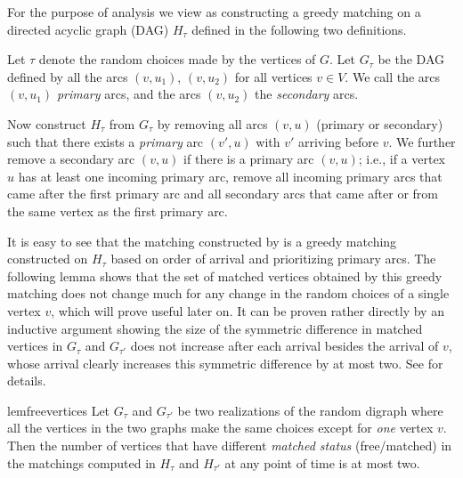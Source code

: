 For the purpose of analysis we view  as constructing a greedy matching on a directed acyclic graph (DAG) $H_\tau$ defined in the following two definitions.

\begin{Def}\label{def:g-tau}
Let $\tau$ denote the random choices made by the vertices of $G$. Let $G_\tau$ be the DAG defined by all the arcs $(v, u_1)$, $(v, u_2)$ for all vertices $v \in V$. 
We call the arcs $(v, u_1)$ \emph{primary} arcs, and the arcs $(v, u_2)$ the \emph{secondary} arcs. 
\end{Def}

\begin{Def}\label{def:h-tau}
Now construct $H_\tau$ from $G_\tau$ by removing all arcs $(v, u)$ (primary or secondary) such that there exists 
a \emph{primary} arc $(v', u)$ with $v'$ arriving before $v$. We further remove a secondary arc $(v,u)$ if there is a primary arc $(v,u)$; 
i.e., if a vertex $u$ has at least one incoming primary arc, remove all incoming primary arcs 
that came after the first primary arc and all secondary arcs that came after or from the same vertex as the first primary arc. 
\end{Def}

It is easy to see that the matching constructed by  is a greedy matching constructed on $H_\tau$ based on order of arrival and prioritizing primary arcs. The following lemma shows that the set of matched vertices obtained by this greedy matching does not change much for any change in the random choices of a single vertex $v$, which will prove useful later on. 
It can be proven rather directly by an inductive argument showing the size of the symmetric difference in matched vertices in $G_\tau$ and $G_{\tau'}$ does not increase after each arrival besides the arrival of $v$, whose arrival clearly increases this symmetric difference by at most two. See  for details.

\begin{restatable}{lem}{freevertices}\label{lem:freevertices}
  Let $G_{\tau}$ and $G_{\tau'}$ be two realizations of the random digraph where all the vertices in 
  the two graphs make the same choices except for \emph{one} vertex $v$. 
  Then the number of vertices that have different \emph{matched status} (free/matched) in the matchings computed in $H_{\tau}$ and $H_{\tau'}$
  at any point of time is at most two.
\end{restatable}